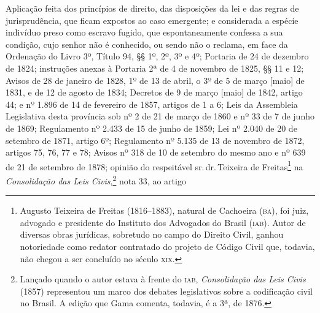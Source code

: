 Aplicação feita dos princípios de direito, das disposições da lei e das
regras de jurisprudência, que ficam expostos ao caso emergente; e
considerada a espécie indivíduo preso como escravo fugido, que
espontaneamente confessa a sua condição, cujo senhor não é conhecido, ou
sendo não o reclama, em face da Ordenação do Livro 3º, Título 94, §§ 1º,
2º, 3º e 4º; Portaria de 24 de dezembro de 1824; instruções anexas à
Portaria 2ª de 4 de novembro de 1825, §§ 11 e 12; Avisos de 28 de
janeiro de 1828, 1º de 13 de abril, o 3º de 5 de março {[}maio{]} de
1831, e de 12 de agosto de 1834; Decretos de 9 de março {[}maio{]} de
1842, artigo 44; e nº 1.896 de 14 de fevereiro de 1857, artigos de
1 a 6; Leis da Assembleia Legislativa desta província sob nº 2 de 21 de
março de 1860 e nº 33 de 7 de junho de 1869; Regulamento nº 2.433 de 15
de junho de 1859; Lei nº 2.040 de 20 de setembro de 1871, artigo 6º;
Regulamento nº 5.135 de 13 de novembro de 1872, artigos 75, 76, 77 e 78;
Avisos nº 318 de 10 de setembro do mesmo ano e nº 639 de 21 de setembro
de 1878; opinião do respeitável sr.\,dr.\,Teixeira de Freitas\footnote{
  Augusto Teixeira de Freitas (1816--1883), natural de Cachoeira (\textsc{ba}),
  foi juiz, advogado e presidente do Instituto dos Advogados do Brasil
  (\textsc{iab}). Autor de diversas obras jurídicas, sobretudo no campo do
  Direito Civil, ganhou notoriedade como redator contratado do projeto
  de Código Civil que, todavia, não chegou a ser concluído no século \textsc{xix}.}
na \emph{Consolidação das Leis Civis},\footnote{Lançado quando o autor
  estava à frente do \textsc{iab},
  \emph{Consolidação das Leis Civis} (1857) representou um marco dos
  debates legislativos sobre a codificação civil no Brasil. A edição que
  Gama comenta, todavia, é a 3ª, de 1876.} nota 33, ao artigo
